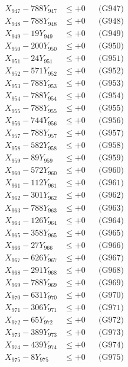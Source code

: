 \documentclass[a4paper,10pt]{article}
\begin{document}
{\begin{align}
X_{947} - 788Y_{947} &\leq +0 && \text{(G947)} \\
X_{948} - 788Y_{948} &\leq +0 && \text{(G948)} \\
X_{949} - 19Y_{949} &\leq +0 && \text{(G949)} \\
X_{950} - 200Y_{950} &\leq +0 && \text{(G950)} \\
\allowbreak
X_{951} - 24Y_{951} &\leq +0 && \text{(G951)} \\
X_{952} - 571Y_{952} &\leq +0 && \text{(G952)} \\
X_{953} - 788Y_{953} &\leq +0 && \text{(G953)} \\
X_{954} - 788Y_{954} &\leq +0 && \text{(G954)} \\
X_{955} - 788Y_{955} &\leq +0 && \text{(G955)} \\
X_{956} - 744Y_{956} &\leq +0 && \text{(G956)} \\
X_{957} - 788Y_{957} &\leq +0 && \text{(G957)} \\
X_{958} - 582Y_{958} &\leq +0 && \text{(G958)} \\
X_{959} - 89Y_{959} &\leq +0 && \text{(G959)} \\
X_{960} - 572Y_{960} &\leq +0 && \text{(G960)} \\
\allowbreak
X_{961} - 112Y_{961} &\leq +0 && \text{(G961)} \\
X_{962} - 301Y_{962} &\leq +0 && \text{(G962)} \\
X_{963} - 788Y_{963} &\leq +0 && \text{(G963)} \\
X_{964} - 126Y_{964} &\leq +0 && \text{(G964)} \\
X_{965} - 358Y_{965} &\leq +0 && \text{(G965)} \\
X_{966} - 27Y_{966} &\leq +0 && \text{(G966)} \\
X_{967} - 626Y_{967} &\leq +0 && \text{(G967)} \\
X_{968} - 291Y_{968} &\leq +0 && \text{(G968)} \\
X_{969} - 788Y_{969} &\leq +0 && \text{(G969)} \\
X_{970} - 631Y_{970} &\leq +0 && \text{(G970)} \\
\allowbreak
X_{971} - 306Y_{971} &\leq +0 && \text{(G971)} \\
X_{972} - 65Y_{972} &\leq +0 && \text{(G972)} \\
X_{973} - 389Y_{973} &\leq +0 && \text{(G973)} \\
X_{974} - 439Y_{974} &\leq +0 && \text{(G974)} \\
X_{975} - 8Y_{975} &\leq +0 && \text{(G975)} \\

\end{align}}
\end{document}
